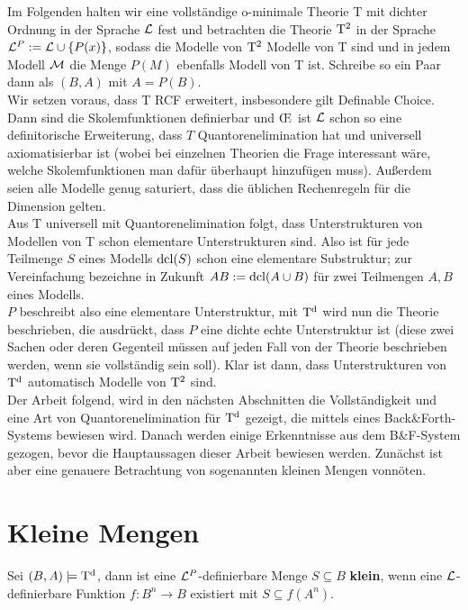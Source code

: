 Im Folgenden halten wir eine vollständige o-minimale Theorie T mit dichter Ordnung in der Sprache $\mathcal{L}$ fest und betrachten die Theorie $\operatorname{T^2}$ in der Sprache $\mathcal{L}^P:=\mathcal{L}\cup\{P(x)\}$, sodass die Modelle von $\operatorname{T^2}$ Modelle von T sind und in jedem Modell $\mathcal{M}$ die Menge $P(M)$ ebenfalls Modell von T ist. Schreibe so ein Paar dann als $(B,A)$ mit $A=P(B)$.\\
Wir setzen voraus, dass T RCF erweitert, insbesondere gilt Definable Choice. Dann sind die Skolemfunktionen definierbar und \OE\ ist $\mathcal{L}$ schon so eine definitorische Erweiterung, dass $T$ Quantorenelimination hat und universell axiomatisierbar ist (wobei bei einzelnen Theorien die Frage interessant wäre, welche Skolemfunktionen man dafür überhaupt hinzufügen muss). Außerdem seien alle Modelle genug saturiert, dass die üblichen Rechenregeln für die Dimension gelten.\\
Aus T universell mit Quantorenelimination folgt, dass Unterstrukturen von Modellen von T schon elementare Unterstrukturen sind. Also ist für jede Teilmenge $S$ eines Modells $\operatorname{dcl}(S)$ schon eine elementare Substruktur; zur Vereinfachung bezeichne in Zukunft $AB:=\operatorname{dcl}(A\cup B)$ für zwei Teilmengen $A,B$ eines Modells.\\
$P$ beschreibt also eine elementare Unterstruktur, mit $\operatorname{T^d}$ wird nun die Theorie beschrieben, die ausdrückt, dass $P$ eine dichte echte Unterstruktur ist (diese zwei Sachen oder deren Gegenteil müssen auf jeden Fall von der Theorie beschrieben werden, wenn sie vollständig sein soll). Klar ist dann, dass Unterstrukturen von $\operatorname{T^d}$ automatisch Modelle von $\operatorname{T^2}$ sind.\\
Der Arbeit \cite{VanDenDries} folgend, wird in den nächsten Abschnitten die Vollständigkeit und eine Art von Quantorenelimination für $\operatorname{T^d}$ gezeigt, die mittels eines Back\&Forth-Systems bewiesen wird. Danach werden einige Erkenntnisse aus dem B\&F-System gezogen, bevor die Hauptaussagen dieser Arbeit bewiesen werden. Zunächst ist aber eine genauere Betrachtung von sogenannten kleinen Mengen vonnöten.

\section{Kleine Mengen}
\begin{definition}
	Sei $(B,A)\models\operatorname{T^d}$, dann ist eine $\mathcal{L}^P$-definierbare Menge $S\subseteq B$ \textbf{klein}, wenn eine $\mathcal{L}$-definierbare Funktion $f:B^n\rightarrow B$ existiert mit $S\subseteq f(A^n)$.
\end{definition}

